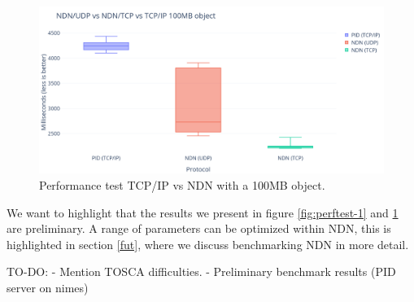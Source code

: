 \begin{figure}[H]
\centering
\includegraphics[scale=0.3]{Images/bench100MB.png}
\caption{Performance test TCP/IP vs NDN with a 100MB object.}
\label{fig:perftest-2}
\end{figure}

We want to highlight that the results we present in figure \ref{fig:perftest-1} and \ref{fig:perftest-2} are preliminary. A range of parameters can be optimized within NDN, this is highlighted in section \ref{fut}, where we discuss benchmarking NDN in more detail.


TO-DO: 
- Mention TOSCA difficulties.
- Preliminary benchmark results (PID server on nimes)
